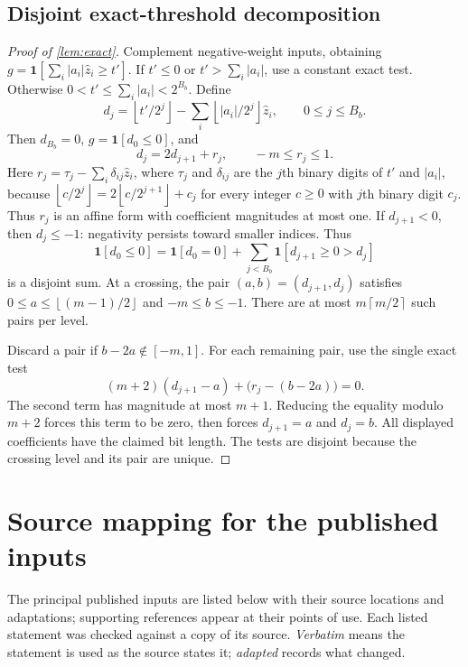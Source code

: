 \documentclass[11pt,letterpaper]{article}
\theoremstyle{definition}
\theoremstyle{remark}
\newcommand{\ind}{\mathbf 1}
\newcommand{\ceil}[1]{\left\lceil #1\right\rceil}
\newcommand{\floor}[1]{\left\lfloor #1\right\rfloor}
\newcommand{\abs}[1]{\left|#1\right|}
\begin{document}
\subsection{Disjoint exact-threshold decomposition}\label{app:exact}
\begin{proof}[Proof of \cref{lem:exact}]
Complement negative-weight inputs, obtaining
\(g=\ind[\sum_i\abs{a_i}\widehat z_i\ge t']\).
If \(t'\le0\) or \(t'>\sum_i\abs{a_i}\), use a constant exact test.
Otherwise \(0<t'\le\sum_i\abs{a_i}<2^{B_b}\). Define
\[
 d_j=\floor{t'/2^j}-\sum_i\floor{\abs{a_i}/2^j}\widehat z_i,
 \qquad 0\le j\le B_b.
\]
Then \(d_{B_b}=0\), \(g=\ind[d_0\le0]\), and
\[
 d_j=2d_{j+1}+r_j,\qquad -m\le r_j\le1.
\]
Here \(r_j=\tau_j-\sum_i\delta_{ij}\widehat z_i\), where \(\tau_j\) and
\(\delta_{ij}\) are the \(j\)th binary digits of \(t'\) and \(\abs{a_i}\),
because \(\floor{c/2^j}=2\floor{c/2^{j+1}}+c_j\) for every integer
\(c\ge0\) with \(j\)th binary digit \(c_j\). Thus \(r_j\) is an affine
form with coefficient magnitudes at most one.
If \(d_{j+1}<0\), then \(d_j\le-1\): negativity persists toward
smaller indices. Thus
\[
 \ind[d_0\le0]
 =\ind[d_0=0]+\sum_{j<B_b}\ind[d_{j+1}\ge0>d_j]
\]
is a disjoint sum. At a crossing, the pair
\((a,b)=(d_{j+1},d_j)\) satisfies
\(0\le a\le\floor{(m-1)/2}\) and \(-m\le b\le-1\).
There are at most \(m\ceil{m/2}\) such pairs per level.

Discard a pair if \(b-2a\notin[-m,1]\). For each remaining pair, use
the single exact test
\[
 (m+2)(d_{j+1}-a)+\bigl(r_j-(b-2a)\bigr)=0.
\]
The second term has magnitude at most \(m+1\). Reducing the equality
modulo \(m+2\) forces this term to be zero, then forces
\(d_{j+1}=a\) and \(d_j=b\). All displayed coefficients have the
claimed bit length. The tests are disjoint because the crossing
level and its pair are unique.
\end{proof}


\section{Source mapping for the published inputs}\label{app:sources}

The principal published inputs are listed below with their source
locations and adaptations; supporting references appear at their points
of use. Each listed statement was checked against a copy of its source. \emph{Verbatim}
means the statement is used as the source states it; \emph{adapted}
records what changed.
\end{document}
